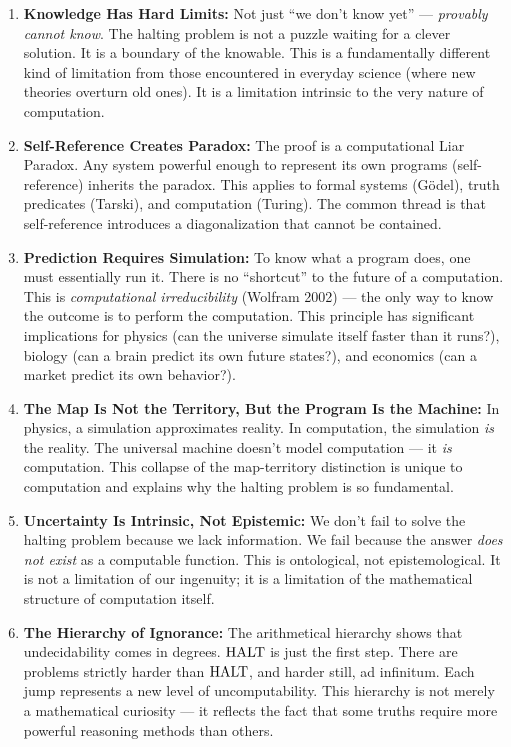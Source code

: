 \begin{enumerate}
\item \textbf{Knowledge Has Hard Limits:} Not just ``we don't know yet'' — \emph{provably cannot know}. The halting problem is not a puzzle waiting for a clever solution. It is a boundary of the knowable. This is a fundamentally different kind of limitation from those encountered in everyday science (where new theories overturn old ones). It is a limitation intrinsic to the very nature of computation.

\item \textbf{Self-Reference Creates Paradox:} The proof is a computational Liar Paradox. Any system powerful enough to represent its own programs (self-reference) inherits the paradox. This applies to formal systems (G\"odel), truth predicates (Tarski), and computation (Turing). The common thread is that self-reference introduces a diagonalization that cannot be contained.

\item \textbf{Prediction Requires Simulation:} To know what a program does, one must essentially run it. There is no ``shortcut'' to the future of a computation. This is \emph{computational irreducibility} (Wolfram 2002) — the only way to know the outcome is to perform the computation. This principle has significant implications for physics (can the universe simulate itself faster than it runs?), biology (can a brain predict its own future states?), and economics (can a market predict its own behavior?).

\item \textbf{The Map Is Not the Territory, But the Program Is the Machine:} In physics, a simulation approximates reality. In computation, the simulation \emph{is} the reality. The universal machine doesn't model computation — it \emph{is} computation. This collapse of the map-territory distinction is unique to computation and explains why the halting problem is so fundamental.

\item \textbf{Uncertainty Is Intrinsic, Not Epistemic:} We don't fail to solve the halting problem because we lack information. We fail because the answer \emph{does not exist} as a computable function. This is ontological, not epistemological. It is not a limitation of our ingenuity; it is a limitation of the mathematical structure of computation itself.

\item \textbf{The Hierarchy of Ignorance:} The arithmetical hierarchy shows that undecidability comes in degrees. $\text{HALT}$ is just the first step. There are problems strictly harder than $\text{HALT}$, and harder still, ad infinitum. Each jump represents a new level of uncomputability. This hierarchy is not merely a mathematical curiosity — it reflects the fact that some truths require more powerful reasoning methods than others.


\end{enumerate}
